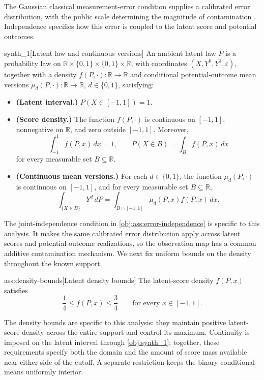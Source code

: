 The Gaussian classical measurement-error condition supplies a calibrated error distribution, with the public scale determining the magnitude of contamination \citep{PeiShen2017DevilTails}. Independence specifies how this error is coupled to the latent score and potential outcomes.

\begin{definitionv}{synth_1}[Latent law and continuous versions]
An ambient latent law \(P\) is a probability law on \(\mathbb R\times\{0,1\}\times\{0,1\}\times\mathbb R\), with coordinates \((X,Y^0,Y^1,\varepsilon)\), together with a density \(f(P,\cdot):\mathbb R\to\mathbb R\) and conditional potential-outcome mean versions \(\mu_d(P,\cdot):\mathbb R\to\mathbb R\), \(d\in\{0,1\}\), satisfying:
\begin{itemize}
\item \textbf{(Latent interval.)} \(P(X\in[-1,1])=1\).
\item \textbf{(Score density.)} The function \(f(P,\cdot)\) is continuous on \([-1,1]\), nonnegative on \(\mathbb R\), and zero outside \([-1,1]\). Moreover,
\[
\int_{-1}^{1} f(P,x)\,dx=1,
\qquad
P(X\in B)=\int_B f(P,x)\,dx
\]
for every measurable set \(B\subseteq\mathbb R\).
\item \textbf{(Continuous mean versions.)} For each \(d\in\{0,1\}\), the function \(\mu_d(P,\cdot)\) is continuous on \([-1,1]\), and for every measurable set \(B\subseteq\mathbb R\),
\[
\int_{\{X\in B\}} Y^d\,dP
=
\int_{B\cap[-1,1]} \mu_d(P,x)f(P,x)\,dx.
\]
\end{itemize}
\end{definitionv}

The joint-independence condition in \cref{obj:ass:error-independence} is specific to this analysis. It makes the same calibrated error distribution apply across latent scores and potential-outcome realizations, so the observation map has a common additive contamination mechanism. We next fix uniform bounds on the density throughout the known support.

\begin{assumptionv}{ass:density-bounds}[Latent density bounds]
The latent-score density \(f(P,x)\) satisfies
\[
\frac14\le f(P,x)\le\frac34
\qquad\text{for every }x\in[-1,1].
\]
\end{assumptionv}

The density bounds are specific to this analysis: they maintain positive latent-score density across the entire support and control its maximum. Continuity is imposed on the latent interval through \cref{obj:synth_1}; together, these requirements specify both the domain and the amount of score mass available near either side of the cutoff. A separate restriction keeps the binary conditional means uniformly interior.

